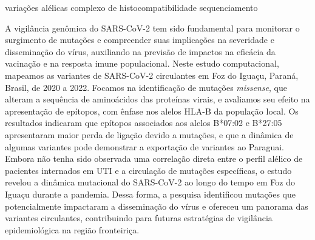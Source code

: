 {variações alélicas}
{complexo de histocompatibilidade}
{sequenciamento}





\begin{justifying}

A vigilância genômica do SARS-CoV-2 tem sido fundamental para monitorar o surgimento de mutações e compreender suas implicações na severidade e disseminação do vírus, auxiliando na previsão de impactos na eficácia da vacinação e na resposta imune populacional. Neste estudo computacional, mapeamos as variantes de SARS-CoV-2 circulantes em Foz do Iguaçu, Paraná, Brasil, de 2020 a 2022. Focamos na identificação de mutações \textit{missense}, que alteram a sequência de aminoácidos das proteínas virais, e avaliamos seu efeito na apresentação de epítopos, com ênfase nos alelos HLA-B da população local. Os resultados indicaram que epítopos associados aos alelos B*07:02 e B*27:05 apresentaram maior perda de ligação devido a mutações, e que a dinâmica de algumas variantes pode demonstrar a exportação de variantes ao Paraguai. Embora não tenha sido observada uma correlação direta entre o perfil alélico de pacientes internados em UTI e a circulação de mutações específicas, o estudo revelou a dinâmica mutacional do SARS-CoV-2 ao longo do tempo em Foz do Iguaçu durante a pandemia. Dessa forma, a pesquisa identificou mutações que potencialmente impactaram a disseminação do vírus e ofereceu um panorama das variantes circulantes, contribuindo para futuras estratégias de vigilância epidemiológica na região fronteiriça.

\end{justifying}

\imprimirchaves %


